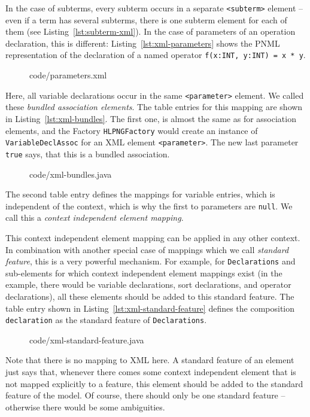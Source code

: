 In the case of subterms, every subterm occurs in a separate \verb+<subterm>+
element -- even if a term has several subterms, there is one subterm element
for each of them (see Listing~\ref{lst:subterm-xml}). In the case of parameters
of an operation declaration, this is different: Listing~\ref{lst:xml-parameters}
shows the PNML representation of the declaration of a named operator
{\tt f(x:INT, y:INT) =  x * y}.
%
\begin{figure}[htbp!]
%
{code/parameters.xml}
\end{figure}
%
Here, all variable declarations occur in the same \verb+<parameter>+ element.
We called these \emph{bundled association elements}.%
The table entries for this
mapping are shown in Listing~\ref{lst:xml-bundles}. The first one, is almost the
same as for association elements, and the Factory {\tt HLPNGFactory}
would create an instance of {\tt VariableDeclAssoc} for an XML element
\verb+<parameter>+. The new last parameter {\tt true} says, that this is
a bundled association.
%
\begin{figure}[tbp!]
%
{code/xml-bundles.java}
\end{figure}
%
The second table entry defines the mappings for variable entries, which
is independent of the context, which is why the first to parameters are
{\tt null}. We call this a \emph{context independent element mapping}.%
  
This context independent element mapping can be applied in any other
context. In combination with another special case of mappings which we
call \emph{standard feature},%
this is a very powerful mechanism. For example, for {\tt Declarations} and
sub-elements for which context independent element mappings exist (in the
example, there would be variable declarations, sort declarations, and
operator declarations), all these elements should be added to this standard
feature. The table entry shown in Listing~\ref{lst:xml-standard-feature} defines
the composition {\tt declaration} as the standard feature of {\tt Declarations}.
%
\begin{figure}[htbp!]
%
{code/xml-standard-feature.java}
\end{figure}
%
Note that there is no mapping to XML here. A standard feature of an element just
says that, whenever there comes some context independent element that is not
mapped explicitly to a feature, this element should be added to the standard
feature of the model. Of course, there should only be one standard feature --
otherwise there would be some ambiguities.%

